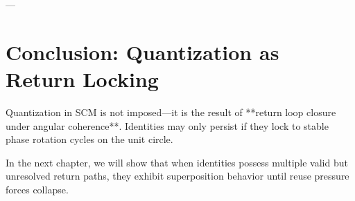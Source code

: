 ---

\section{Conclusion: Quantization as Return Locking}

Quantization in SCM is not imposed—it is the result of **return loop closure under angular coherence**. Identities may only persist if they lock to stable phase rotation cycles on the unit circle.

In the next chapter, we will show that when identities possess multiple valid but unresolved return paths, they exhibit superposition behavior until reuse pressure forces collapse.
